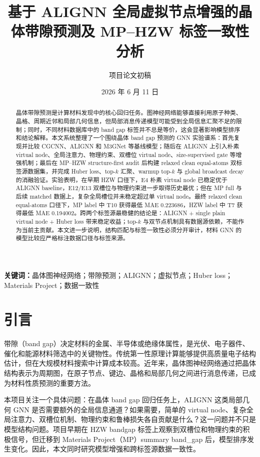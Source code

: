 \documentclass[UTF8,a4paper,11pt]{ctexart}
\title{\bfseries 基于 ALIGNN 全局虚拟节点增强的晶体带隙预测及 MP--HZW 标签一致性分析}
\author{项目论文初稿}
\date{2026 年 6 月 11 日}
\begin{document}
\maketitle

\begin{abstract}
晶体带隙预测是计算材料发现中的核心回归任务。图神经网络能够直接利用原子种类、晶格、周期近邻和局部几何信息，但局部消息传递模型可能受到全局信息汇聚不足的限制；同时，不同材料数据库中的 band gap 标签并不总是等价，这会显著影响模型排序和结论解释。本文系统整理了一个围绕晶体 band gap 预测的 GNN 实验谱系：首先复现并比较 CGCNN、ALIGNN 和 M3GNet 等基线模型；随后在 ALIGNN 上引入朴素 virtual node、全局注意力、物理约束、双槽位 virtual node、size-supervised gate 等增强机制；最后在 MP--HZW structure-first audit 后构建 relaxed clean equal-atoms 双标签源数据集，并完成 Huber loss、top-$k$ 汇聚、warmup top-$k$ 与 global broadcast decay 的消融验证。实验表明，在早期 HZW 口径下，E4 朴素 virtual node 已稳定优于 ALIGNN baseline，E12/E13 双槽位与物理约束进一步取得历史最优；但在 MP full 与后续 matched 数据上，复杂全局槽位并未稳定超过单 virtual node。最终 relaxed clean equal-atoms 口径下，MP label 中 T10 获得最低 MAE 0.223686，HZW label 中 T7 获得最低 MAE 0.194002。跨两个标签源最稳健的结论是：ALIGNN + single plain virtual node + Huber loss 带来稳定收益；top-$k$ 与双节点机制具有数据源依赖，不能作为当前主贡献。本文进一步说明，结构匹配与标签一致性必须分开审计，材料 GNN 的模型比较应严格标注数据口径与标签来源。
\end{abstract}

\noindent\textbf{关键词：}晶体图神经网络；带隙预测；ALIGNN；虚拟节点；Huber loss；Materials Project；数据一致性

\section{引言}

带隙（band gap）决定材料的金属、半导体或绝缘体属性，是光伏、电子器件、催化和能源材料筛选中的关键物性。传统第一性原理计算能够提供高质量电子结构估计，但在大规模材料搜索中计算成本较高。近年来，晶体图神经网络通过把晶体结构表示为周期图，在原子节点、键边、晶格和局部几何之间进行消息传递，已成为材料性质预测的重要方法。

本项目关注一个具体问题：在晶体 band gap 回归任务上，ALIGNN 这类局部几何 GNN 是否需要额外的全局信息通道？如果需要，简单的 virtual node、复杂全局注意力、双槽位机制、物理约束和鲁棒损失各自贡献是什么？这一问题并不只是模型结构问题。项目早期在 HZW bandgap 标签上观察到双槽位和物理约束的积极信号，但迁移到 Materials Project（MP）summary band\_gap 后，模型排序发生变化。因此，本文同时研究模型增强和跨标签源数据一致性。
\end{document}

